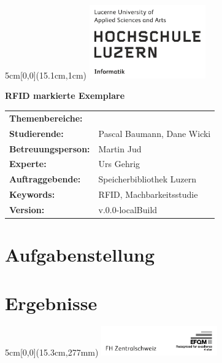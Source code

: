 \documentclass[
	a4paper
]{scrartcl}
\providecommand{\docversion}{0.0-localBuild}
\begin{document}

\begin{textblock*}{5cm}[0,0](15.1cm,1cm)
	\includegraphics[keepaspectratio,width=5cm]{img/HSLU_Logo}
\end{textblock*}

\vspace*{2cm}

\noindent
\textbf{\Huge{RFID markierte Exemplare}} \\

\vspace{0.5em}

\bgroup
\setlength\tabcolsep{0cm}

\begin{Large}
\noindent
\begin{tabularx}{\textwidth}{p{5cm}X}
	\textbf{Themenbereiche:} & \\
	\textbf{Studierende:} & Pascal Baumann, Dane Wicki\\
	\textbf{Betreuungsperson:} & Martin Jud\\
	\textbf{Experte:} & Urs Gehrig\\
	\textbf{Auftraggebende:} & Speicherbibliothek Luzern\\
	\textbf{Keywords:} & RFID, Machbarkeitsstudie\\
	\textbf{Version:} & v.\docversion\\
\end{tabularx}
\end{Large}
\egroup

\section{Aufgabenstellung}

\section{Ergebnisse}

\begin{textblock*}{5cm}[0,0](15.3cm,277mm)
	\includegraphics[keepaspectratio,width=5cm]{img/FHZ_Logo}
\end{textblock*}
\end{document}
